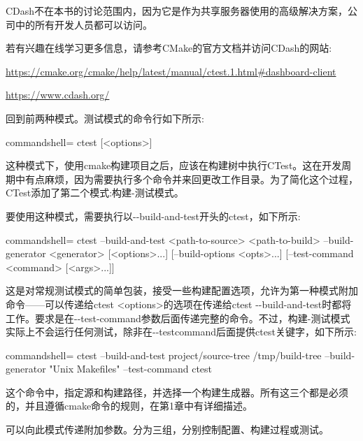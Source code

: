 CDash不在本书的讨论范围内，因为它是作为共享服务器使用的高级解决方案，公司中的所有开发人员都可以访问。

\begin{tcolorbox}[colback=blue!5!white,colframe=blue!75!black,title=Note]
若有兴趣在线学习更多信息，请参考CMake的官方文档并访问CDash的网站:

\url{https://cmake.org/cmake/help/latest/manual/ctest.1.html\#dashboard-client}

\url{https://www.cdash.org/}
\end{tcolorbox}

回到前两种模式。测试模式的命令行如下所示:

\begin{tcblisting}{commandshell={}}
ctest [<options>]
\end{tcblisting}

这种模式下，使用cmake构建项目之后，应该在构建树中执行CTest。这在开发周期中有点麻烦，因为需要执行多个命令并来回更改工作目录。为了简化这个过程，CTest添加了第二个模式:构建-测试模式。


要使用这种模式，需要执行以-{}-build-and-test开头的ctest，如下所示:

\begin{tcblisting}{commandshell={}}
ctest --build-and-test <path-to-source> <path-to-build>
      --build-generator <generator> [<options>...]
      [--build-options <opts>...]
      [--test-command <command> [<args>...]]
\end{tcblisting}

这是对常规测试模式的简单包装，接受一些构建配置选项，允许为第一种模式附加命令——可以传递给ctest <options>的选项在传递给ctest -{}-build-and-test时都将工作。要求是在-{}-test-command参数后面传递完整的命令。不过，构建-测试模式实际上不会运行任何测试，除非在-{}-testcommand后面提供ctest关键字，如下所示:

\begin{tcblisting}{commandshell={}}
ctest --build-and-test project/source-tree /tmp/build-tree
--build-generator "Unix Makefiles" --test-command ctest
\end{tcblisting}

这个命令中，指定源和构建路径，并选择一个构建生成器。所有这三个都是必须的，并且遵循cmake命令的规则，在第1章中有详细描述。

可以向此模式传递附加参数。分为三组，分别控制配置、构建过程或测试。

